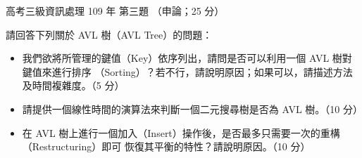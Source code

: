 \begin{pastexam}[label={px:gk3-109-ds-03}]{高考三級資訊處理 109 年 第三題}
（申論；25 分）

請回答下列關於 AVL 樹（AVL Tree）的問題：
\begin{itemize}[leftmargin=2em, labelsep=0.3em, itemsep=2pt]
\item[㈠] 我們欲將所管理的鍵值（Key）依序列出，請問是否可以利用一個 AVL 樹對鍵值來進行排序
（Sorting）？若不行，請說明原因；如果可以，請描述方法及時間複雜度。（5 分）
\item[㈡] 請提供一個線性時間的演算法來判斷一個二元搜尋樹是否為 AVL 樹。（10 分）
\item[㈢] 在 AVL 樹上進行一個加入（Insert）操作後，是否最多只需要一次的重構（Restructuring）即可
恢復其平衡的特性？請說明原因。（10 分）
\end{itemize}
\end{pastexam}

